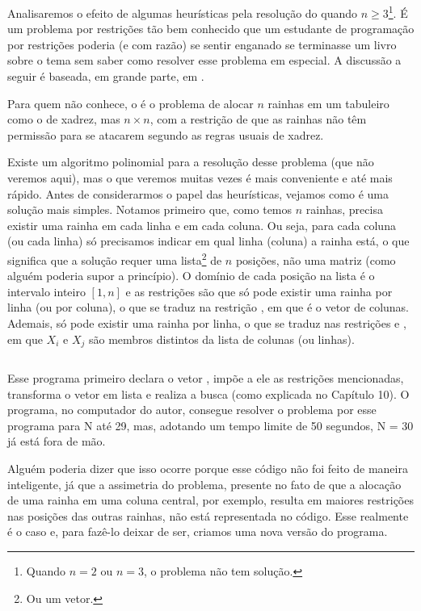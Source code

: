 \documentclass{article}
\begin{document}
Analisaremos o efeito de algumas heurísticas pela resolução do  quando $n \geq 3$\footnote{Quando $n = 2$ ou $n = 3$, o problema não tem solução.}. É um
problema por restrições tão bem conhecido que um estudante de programação por
restrições poderia (e com razão) se sentir enganado se terminasse um livro sobre o tema sem saber
como resolver esse problema em especial. A discussão a seguir é baseada, em grande parte, em
\cite{krzysztof}.

Para quem não conhece, o  é o problema de alocar $n$ rainhas em um
tabuleiro como o de xadrez, mas $n\times n$, com a restrição de que as rainhas não têm permissão
para se atacarem segundo as regras usuais de xadrez.

Existe um algoritmo polinomial para a resolução desse problema (que não veremos aqui), mas o que
veremos muitas vezes é mais conveniente e até mais rápido. Antes de considerarmos o papel das
heurísticas, vejamos como é uma solução mais simples. Notamos primeiro que, como temos $n$ rainhas,
precisa existir uma rainha em cada linha e em cada coluna. Ou seja, para cada coluna (ou cada linha)
só precisamos indicar em qual linha (coluna) a rainha está, o que significa que a solução requer uma
lista\footnote{Ou um vetor.} de $n$ posições, não uma matriz (como alguém poderia supor a princípio). O domínio de cada
posição na lista é o intervalo inteiro $[1,n]$ e as restrições são que só pode existir uma rainha
por linha (ou por coluna), o que se traduz na restrição , em que
 é o vetor de colunas. Ademais, só pode existir uma rainha por linha, o que se traduz nas
restrições  e , em que $X_i$ e $X_j$ são membros distintos da lista de colunas (ou linhas).

\inputminted{prolog}{../Exemplos/Cap11/prog1_queens.ecl}

Esse programa primeiro declara o vetor , impõe a ele as restrições mencionadas,
transforma o vetor em lista e realiza a busca (como explicada no Capítulo 10).%
O programa, no computador do autor, consegue resolver o problema por esse programa para N até 29,
mas, adotando um tempo limite de 50 segundos, N = 30 já está fora de mão.

Alguém poderia dizer que isso ocorre porque esse código não foi feito de maneira inteligente,
já que a assimetria do problema, presente no fato de que a alocação de uma rainha em uma coluna
central, por exemplo, resulta em maiores restrições nas posições das outras rainhas, não está
representada no código. Esse realmente é o caso e, para fazê-lo deixar de ser, criamos uma nova
versão do programa.
\end{document}

